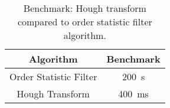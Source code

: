 \documentclass{article}
\begin{document}


\begin{table}[t]
\centering
\begin{tabular}{c c}
\hline
\textbf{Algorithm} & \textbf{Benchmark} \\
\hline
Order Statistic Filter & 200~s \\
Hough Transform & 400~ms \\
\hline
\end{tabular}
\caption{Benchmark: Hough transform compared to order statistic filter algorithm.}
\end{table}
\end{document}
